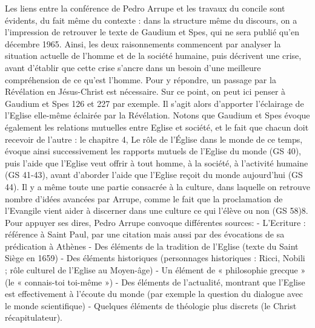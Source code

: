 Les liens entre la conférence de Pedro Arrupe et les travaux du concile sont évidents, du fait même du contexte : dans la structure même du discours, on a l’impression de retrouver le texte de Gaudium et Spes, qui ne sera publié qu’en décembre 1965. 
 Ainsi, les deux raisonnements commencent par analyser la situation actuelle de l’homme et de la société humaine, puis décrivent une crise, avant d’établir que cette crise s’ancre dans un besoin d’une meilleure compréhension de ce qu’est l’homme. Pour y répondre, un passage par la Révélation en Jésus-Christ est nécessaire. Sur ce point, on peut ici penser à Gaudium et Spes 126 et 227 par
exemple. Il s’agit alors d’apporter l’éclairage de l’Eglise elle-même éclairée par la Révélation. Notons que Gaudium et Spes évoque également les relations mutuelles entre Eglise et société, et le fait que chacun doit recevoir de l’autre : le chapitre 4, Le rôle de l’Église dans le monde de ce temps, évoque ainsi successivement les rapports mutuels de l’Eglise du monde (GS 40), puis l’aide que l’Eglise veut offrir à tout homme, à la société, à l’activité humaine (GS 41-43), avant d’aborder l’aide que l’Eglise reçoit du monde aujourd’hui (GS 44). Il y a même toute une partie consacrée à la culture, dans laquelle on retrouve nombre d’idées avancées par Arrupe, comme le fait que la proclamation de l’Evangile vient aider à discerner dans une culture ce qui l’élève ou non (GS 58)8.
Pour appuyer ses dires, Pedro Arrupe convoque différentes sources:
-	L’Ecriture : référence à Saint Paul, par une citation mais aussi par des évocations de sa prédication à Athènes
-	Des éléments de la tradition de l’Eglise (texte du Saint Siège en 1659)
-	Des éléments historiques (personnages historiques : Ricci, Nobili ; rôle culturel de l’Eglise au Moyen-âge)
-	Un élément de « philosophie grecque » (le « connais-toi toi-même »)
-	Des éléments de l’actualité, montrant que l’Eglise est effectivement à l’écoute du monde (par exemple la question du dialogue avec le monde scientifique)
-	Quelques éléments de théologie plus discrets (le Christ récapitulateur).


